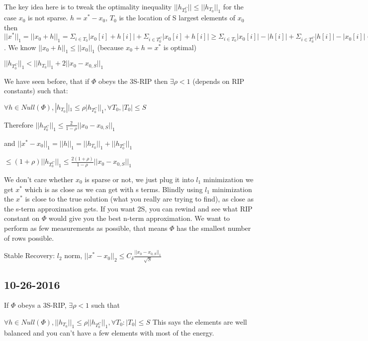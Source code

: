 \documentclass[12pt,letterpaper]{report}
\begin{document}
The key idea here is to tweak the optimality inequality $||h_{T_0^C}|| \leq ||h_{T_0}||_1$ for the case $x_0$ is not sparse.  $h = x^* - x_0$, $T_0$ is the location of S largest elements of $x_0$ then $||x^*||_1 = ||x_0 + h||_1 = \Sigma_{i \in T_0} |x_0[i] + h[i]| + \Sigma_{i \in T_0^C} |x_0[i] + h[i]| \geq \Sigma_{i \in T_0} |x_0[i]| - |h[i]| + \Sigma_{i \in T_0^C} |h[i]| - |x_0[i]| = ||x_0||_1 - 2\Sigma_{i \in T_0^C} |x[i]| - ||h_{T_0}||_1 + ||h_{T_0^C}||_1 = ||x_0||_1 - 2\Sigma_{i \in T_0^C}|x[i]| - ||h_{T_0}||_1 + ||h_{T_0^C}||_1 = ||x_0||_1 - ||h_{T_0}||_1 + ||h_{T_0^C}||_1 - 2||x_0 - x_{0,S}||_1$.  We know $||x_0 + h||_1 \leq ||x_0||_1$ (because $x_0 + h = x^*$ is optimal)

$||h_{T_0^C}||_1 < ||h_{T_0}||_1 + 2||x_0 - x_{0,S}||_1$

We have seen before, that if $\Phi$ obeys the 3S-RIP then $\exists \rho < 1$ (depends on RIP constants) such that:

$\forall h \in Null(\Phi), |h_{T_0}||_1 \leq \rho |h_{T_0^C}||_1, \forall T_0, |T_0| \leq S$

Therefore $||h_{T_0^C}||_1 \leq \frac{2}{1-\rho} ||x_0 - x_{0,S}||_1$

and $||x^* - x_0||_1 = ||h||_1 = ||h_{T_0}||_1 + ||h_{T_0^C}||_1$

$\leq (1 + \rho) ||h_{T_0^C}||_1 \leq \frac{2(1+\rho)}{1-\rho} ||x_0 - x_{0,S}||_1$

We don't care whether $x_0$ is sparse or not, we just plug it into $l_1$ minimization we get $x^*$ which is as close as we can get with s terms.  Blindly using $l_1$ minimization the $x^*$ is close to the true solution (what you really are trying to find), as close as the s-term approximation gets.  If you want 2S, you can rewind and see what RIP constant on $\Phi$ would give you the best n-term approximation.  We want to perform as few measurements as possible, that means $\Phi$ has the smallest number of rows possible.


Stable Recovery: $l_2$ norm, $||x^* - x_0||_2 \leq C_\delta \frac{||x_0 - x_{0,S}||_1}{\sqrt{S}}$

\subsection*{10-26-2016}

If $\Phi$ obeys a 3S-RIP, $\exists \rho < 1$ such that

$\forall h \in Null(\Phi), ||h_{T_0}||_1 \leq \rho ||h_{T_0^C}||_1, \forall T_0: |T_0| \leq S$  This says the elements are well balanced and you can't have a few elements with most of the energy.
\end{document}
